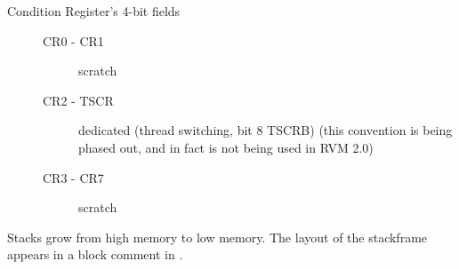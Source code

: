 \begin{description}
\item[Condition Register's 4-bit fields]
\begin{description}
\item    [CR0 - CR1] scratch

\item    [CR2 - TSCR] dedicated (thread switching, bit 8 TSCRB) (this
     convention is being phased out, and in fact is not being used in RVM 2.0)

\item    [CR3 - CR7] scratch
\end{description}
\end{description}



Stacks grow from high memory to low memory.
The layout of the stackframe appears in a block comment in
{\PPCStackframeLayoutURL}.


